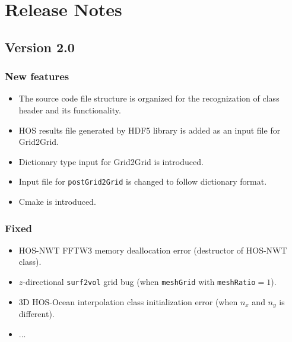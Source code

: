 \pagebreak

\pagebreak
\section*{Release Notes}

\subsection*{Version 2.0}

\subsubsection*{New features}
\begin{itemize}	
	\item The source code file structure is organized for the recognization of class header and its functionality. 
	\item HOS results file generated by HDF5 library is added as an input file for Grid2Grid. 
	\item Dictionary type input for Grid2Grid is introduced. 
	\item Input file for \texttt{postGrid2Grid} is changed to follow dictionary format. 
	\item Cmake is introduced. 
\end{itemize}

\subsubsection*{Fixed}
\begin{itemize}	
	\item HOS-NWT FFTW3 memory deallocation error (destructor of HOS-NWT class). 
	\item $z$-directional \texttt{surf2vol} grid bug (when \texttt{meshGrid} with \texttt{meshRatio}$=1$).
	\item 3D HOS-Ocean interpolation class initialization error (when $n_x$ and $n_y$ is different).
	\item ... 
\end{itemize}


\pagebreak

